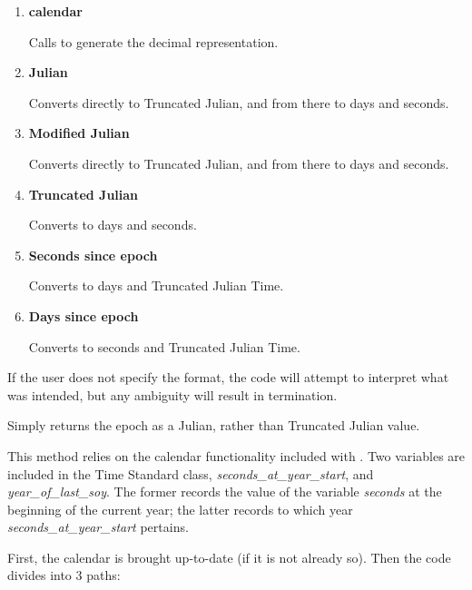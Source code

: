{\begin{enumerate}
{\begin{enumerate}
\begin{enumerate}
\item {\bfseries
calendar}

Calls  to generate 
the decimal
representation.
\item {\bfseries
Julian}

Converts directly to Truncated Julian, and from there to days and
seconds.
\item {\bfseries
Modified Julian}

Converts directly to Truncated Julian, and from there to days and
seconds.
\item {\bfseries
Truncated Julian}

Converts to days and seconds.
\item {\bfseries
Seconds since epoch}

Converts to days and Truncated Julian Time.
\item {\bfseries
Days since epoch}

Converts to seconds and Truncated Julian Time.
\end{enumerate}



If the user does not specify the format, the code will attempt to
interpret what was intended, but any ambiguity will result in
termination.

Simply returns the epoch as a Julian, rather than Truncated Julian
value.

This method relies on the calendar functionality included with \JEODid.  Two 
variables are included in the Time Standard class, 
\textit{seconds\_at\_year\_start}, and \textit{year\_of\_last\_soy}.  The 
former records the value of the variable \textit{seconds} at the beginning of 
the current year; the latter records to which year
\textit{seconds\_at\_year\_start} pertains.

First, the calendar is brought up-to-date (if it is not already so).  Then the 
code divides into 3 paths:


\end{enumerate}}
\end{enumerate}}
